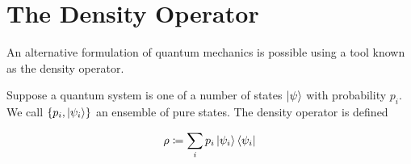 \documentclass[main.tex]{subfiles}
\begin{document}
%
%
%
%
%
%
%
%
\section{The Density Operator}

An alternative formulation of quantum mechanics is possible using a tool known as the density operator.

Suppose a quantum system is one of a number of states $\ket{\psi}$ with probability $p_i$. We call $\{p_i, \ket{\psi_i} \}$ an ensemble of pure states. The density operator is defined

\begin{align*}
\rho \coloneqq \sum_i p_i \ket{\psi_i}\bra{\psi_i}
\end{align*}
\end{document}
